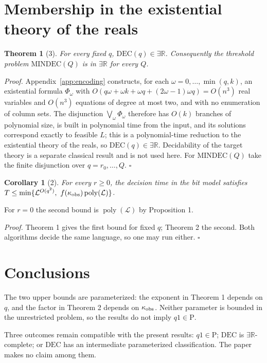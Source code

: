 \documentclass[journal]{IEEEtran}
\theoremstyle{plainn}
\newtheorem*{thm}{Theorem}
\newtheorem*{cor}{Corollary}
\theoremstyle{remark}
\begin{document}
\section{Membership in the existential theory of the reals}\label{sec:existsr}
\begin{thm}[3] For every fixed $q$, $\mathrm{DEC}(q)\in\exists\mathbb R$.
	 Consequently the threshold problem $\mathrm{MINDEC}(Q)$ is in $\exists\mathbb R$ for every $Q$.
\end{thm}
\emph{Proof.} Appendix~\ref{app:encoding} constructs, for each
$\omega=0,\dots,\min(q,k)$, an existential formula $\Phi_\omega$ with
$O(q\omega+\omega k+\omega q+(2\omega-1)\omega q)=O(n^3)$ real variables and $O(n^3)$
equations of degree at most two, and with no enumeration of column sets. The disjunction
$\bigvee_\omega\Phi_\omega$ therefore has $O(k)$ branches of polynomial size, is built in
polynomial time from the input, and its solutions correspond exactly to feasible $L$; this
is a polynomial-time reduction to the existential theory of the reals, so
$\mathrm{DEC}(q)\in\exists\mathbb R$. Decidability of the target theory is a separate
classical result and is not used here. For $\mathrm{MINDEC}(Q)$ take the finite disjunction
over $q=r_0,\dots,Q$. $\square$

\begin{cor}[2] For every $r\ge0$, the decision time in the bit model satisfies $T\le\min\{\mathcal L^{O(q^2)},\ f(\kappa_{\rm obs})\operatorname{poly}(\mathcal L)\}$.
\end{cor}

For $r=0$ the second bound is $\operatorname{poly}(\mathcal L)$ by Proposition 1.

\emph{Proof.} Theorem 1 gives the first bound for fixed $q$; Theorem 2 the second. Both algorithms decide the same language, so one may run either. $\square$


\section{Conclusions}\label{sec:conclusions}
The two upper bounds are parameterized: the exponent in Theorem 1 depends on $q$, and the factor in Theorem 2 depends on $\kappa_{\rm obs}$. Neither parameter is bounded in the unrestricted problem, so the results do not imply $q1\in\mathrm P$.

Three outcomes remain compatible with the present results: $q1\in\mathrm P$; $\mathrm{DEC}$ is $\exists\mathbb R$-complete; or $\mathrm{DEC}$ has an intermediate parameterized classification. The paper makes no claim among them.
\end{document}
